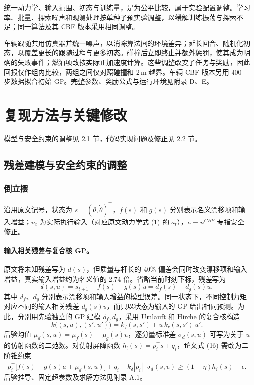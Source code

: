 \documentclass[UTF8,a4paper,zihao=-4,fontset=fandol]{ctexart}
\begin{document}
统一动力学、输入范围、初态与训练量，是为公平比较，属于实验配置调整。学习率、批量、探索噪声和观测处理按单种子预实验调整，以缓解训练振荡与探索不足\cite{fujimoto2018td3,andrychowicz2021matters}；同一算法及其 CBF 版本采用相同调整。

车辆跟随共用仿真器并统一噪声，以消除算法间的环境差异；延长回合、随机化初态，以覆盖更长的跟随过程与更多初态。碰撞后立即终止并额外惩罚，使其成为明确的失败事件；燃油项改按实际正加速度计算。这些调整改变了任务与奖励，因此回报仅作组内比较，两组之间仅对照碰撞和 2\,m 越界。车辆 CBF 版本另用 400 步数据拟合初始 GP。完整参数、奖励公式与运行环境见附录 D、E。

\section{复现方法与关键修改}
\label{sec:changes}
模型与安全约束的调整见 2.1 节，代码实现问题及修正见 2.2 节。
\subsection{残差建模与安全约束的调整}
\label{sec:model}
\subsubsection{倒立摆}
\label{sec:model-pend}
沿用原文记号，状态为 $s=(\theta,\dot\theta)^\top$，$f(s)$ 和 $g(s)$ 分别表示名义漂移项和输入增益；$u_t$ 为实际执行输入（对应原文动力学式 (1) 的 $a_t$），$a=u^{CBF}$ 专指安全修正。

\paragraph{输入相关残差与复合核 GP。}
原文将未知残差写为 $d(s)$，但质量与杆长的 40\% 偏差会同时改变漂移项和输入增益，真实输入增益约为名义值的 2.74 倍。省略当前时刻下标，残差写为
\begin{equation}
d(s,u)=s_{t+1}-f(s)-g(s)u=d_f(s)+d_g(s)u,
\label{eq:residual}
\end{equation}
其中 $d_f$、$d_g$ 分别表示漂移项和输入增益的模型误差。同一状态下，不同控制力矩对应不同的输入相关残差 $d_g(s)u$，而只以状态为输入的 GP 给出相同预测。为此，分别用先验独立的 GP 建模 $d_f,d_g$，采用 Umlauft 和 Hirche 的复合核构造\cite{umlauft2020feedback}
\begin{equation}
k\bigl((s,u),(s',u')\bigr)=k_f(s,s')+u\,k_g(s,s')\,u'.
\end{equation}
后验均值 $\mu_d(s,u)=\mu_f(s)+\mu_g(s)u$，逐分量标准差 $\sigma_d(s,u)$ 可写为关于 $u$ 的仿射函数的二范数。对仿射屏障函数 $h_i(s)=p_i^\top s+q_i$，论文式 (16) 需改为二阶锥约束
\begin{equation}
p_i^\top\bigl[f(s)+g(s)u+\mu_d(s,u)\bigr]+q_i
-k_\delta|p_i|^\top\sigma_d(s,u)
\ge(1-\eta)h_i(s)-\epsilon.
\label{eq:soc}
\end{equation}
后验推导、固定超参数及求解方法见附录 A.1。
\end{document}
